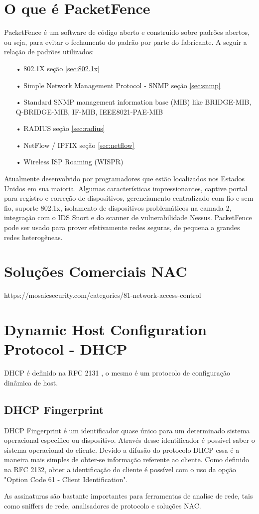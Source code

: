\documentclass[12pt, brazil, ruledheader, pnumromarab,normaltoc]{abnt}
\begin{document}
\section{O que é PacketFence}
PacketFence \cite{url-pf} é um software de código aberto e construido sobre padrões abertos, ou seja, para evitar o fechamento do padrão por parte do fabricante. A seguir a relação de padrões utilizados:
\begin{enumerate}
\item [•] 802.1X seção \ref{sec:802.1x}
\item [•] Simple Network Management Protocol - SNMP seção \ref{sec:snmp}
\item [•] Standard SNMP management information base (MIB) like BRIDGE-MIB, Q-BRIDGE-MIB, IF-MIB, IEEE8021-PAE-MIB
\item [•] RADIUS seção \ref{sec:radius}
\item [•] NetFlow / IPFIX seção \ref{sec:netflow}
\item [•] Wireless ISP Roaming (WISPR)
\end{enumerate}

Atualmente desenvolvido por programadores que estão localizados nos Estados Unidos em sua maioria. Algumas características impressionantes, captive portal para registro e correção de dispositivos, gerenciamento centralizado com fio e sem fio, suporte 802.1x, isolamento de dispositivos problemáticos na camada 2, integração com o IDS Snort e do scanner de vulnerabilidade Nessus. PacketFence pode ser usado para prover efetivamente redes seguras, de pequena a grandes redes heterogêneas.

\section{Soluções Comerciais NAC}
https://mosaicsecurity.com/categories/81-network-access-control

\section{Dynamic Host Configuration Protocol - DHCP}
DHCP é definido na RFC 2131 \cite{rfc-2131}, o mesmo é um protocolo de configuração dinâmica de host.

\subsection{DHCP Fingerprint}\label{sec:dhcp}
DHCP Fingerprint é um identificador quase único para um determinado sistema operacional específico ou dispositivo. Através desse identificador é possível saber o sistema operacional do cliente. Devido a difusão do protocolo DHCP essa é a maneira mais simples de obter-se informação referente ao cliente. Como definido na RFC 2132, obter a identificação do cliente é possível com o uso da opção "Option Code 61 - Client Identification".
\par
As assinaturas são bastante importantes para ferramentas de analise de rede, tais como sniffers de rede, analisadores de protocolo e soluções NAC. %
\end{document}
